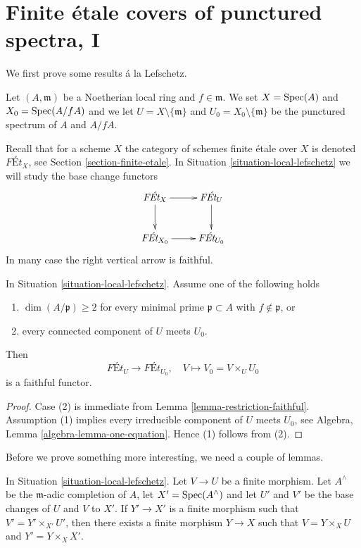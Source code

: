 \section{Finite \'etale covers of punctured spectra, I}
\label{section-pi1-punctured-spec}

\noindent
We first prove some results \'a la Lefschetz.

\begin{situation}
\label{situation-local-lefschetz}
Let $(A, \mathfrak m)$ be a Noetherian local ring and $f \in \mathfrak m$.
We set $X = \mathop{\mathrm{Spec}}(A)$ and $X_0 = \mathop{\mathrm{Spec}}(A/fA)$ and we
let $U = X \setminus \{\mathfrak m\}$ and
$U_0 = X_0 \setminus \{\mathfrak m\}$ be the punctured spectrum of
$A$ and $A/fA$.
\end{situation}

\noindent
Recall that for a scheme $X$ the category of schemes finite
\'etale over $X$ is denoted $\textit{F\'Et}_X$, see
Section \ref{section-finite-etale}.
In Situation \ref{situation-local-lefschetz}
we will study the base change functors
$$
\xymatrix{
\textit{F\'Et}_X \ar[d] \ar[r] & \textit{F\'Et}_U \ar[d] \\
\textit{F\'Et}_{X_0} \ar[r] & \textit{F\'Et}_{U_0}
}
$$
In many case the right vertical arrow is faithful.

\begin{lemma}
\label{lemma-faithful}
In Situation \ref{situation-local-lefschetz}.
Assume one of the following holds
\begin{enumerate}
\item $\dim(A/\mathfrak p) \geq 2$ for every minimal prime
$\mathfrak p \subset A$ with $f \not \in \mathfrak p$, or
\item every connected component of $U$ meets $U_0$.
\end{enumerate}
Then
$$
\textit{F\'Et}_U \longrightarrow \textit{F\'Et}_{U_0},\quad
V \longmapsto V_0 = V \times_U U_0
$$
is a faithful functor.
\end{lemma}

\begin{proof}
Case (2) is immediate from Lemma \ref{lemma-restriction-faithful}.
Assumption (1) implies every irreducible component of $U$ meets $U_0$, see
Algebra, Lemma \ref{algebra-lemma-one-equation}.
Hence (1) follows from (2).
\end{proof}

\noindent
Before we prove something more interesting, we need a couple of lemmas.

\begin{lemma}
\label{lemma-fill-in-missing}
In Situation \ref{situation-local-lefschetz}. Let $V \to U$ be a finite
morphism.  Let $A^\wedge$ be the $\mathfrak m$-adic completion of $A$,
let $X' = \mathop{\mathrm{Spec}}(A^\wedge)$ and let $U'$ and $V'$ be the base changes of
$U$ and $V$ to $X'$. If $Y' \to X'$ is a finite morphism such that
$V' = Y' \times_{X'} U'$, then there exists a finite morphism $Y \to X$
such that $V = Y \times_X U$ and $Y' = Y \times_X X'$.
\end{lemma}

